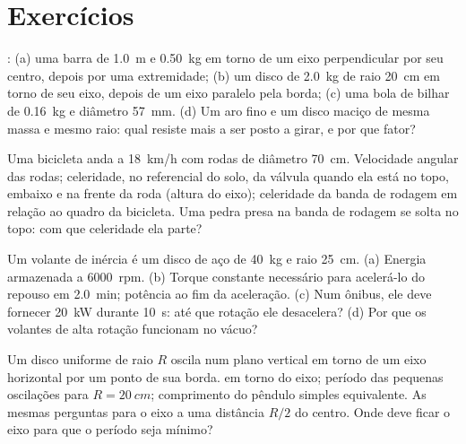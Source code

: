 \section{Exercícios}

\begin{exercise}[$\star$]\label{exo:b2:rigid-body-mechanics:1}
: (a) uma barra de \qty{1.0}{m} e \qty{0.50}{kg} em torno de um
eixo perpendicular por seu centro, depois por uma extremidade; (b) um disco de
\qty{2.0}{kg} de raio \qty{20}{cm} em torno de seu eixo, depois de um
eixo paralelo pela borda; (c) uma bola de bilhar de \qty{0.16}{kg} e
diâmetro \qty{57}{mm}. (d) Um aro fino e um disco maciço de mesma massa
e mesmo raio: qual resiste mais a ser posto a girar, e por que fator?
\end{exercise}

\begin{exercise}[$\star$]\label{exo:b2:rigid-body-mechanics:2}
Uma bicicleta anda a \qty{18}{km/h} com rodas de diâmetro \qty{70}{cm}.
Velocidade angular das rodas; celeridade, no referencial do solo, da
válvula quando ela está no topo, embaixo e na frente da roda (altura do
eixo); celeridade da banda de rodagem em relação ao quadro da
bicicleta. Uma pedra presa na banda de rodagem se solta no topo: com
que celeridade ela parte?
\end{exercise}

\begin{exercise}[$\star$]\label{exo:b2:rigid-body-mechanics:3}
Um volante de inércia é um disco de aço de \qty{40}{kg} e raio \qty{25}{cm}. (a) Energia
armazenada a \qty{6000}{rpm}. (b) Torque constante necessário para acelerá-lo
do repouso em \qty{2.0}{min}; potência ao fim da aceleração. (c) Num
ônibus, ele deve fornecer \qty{20}{kW} durante \qty{10}{s}: até que rotação ele
desacelera? (d) Por que os volantes de alta rotação funcionam no vácuo?
\end{exercise}

\begin{exercise}[$\star$]\label{exo:b2:rigid-body-mechanics:4}
Um disco uniforme de raio $R$ oscila num plano vertical em torno de um
eixo horizontal por um ponto de sua borda.  em torno
do eixo; período das pequenas oscilações para $R = \qty{20}{cm}$; comprimento do
pêndulo simples equivalente. As mesmas perguntas para o eixo a uma
distância $R/2$ do centro. Onde deve ficar o eixo para que o período
seja mínimo?
\end{exercise}

